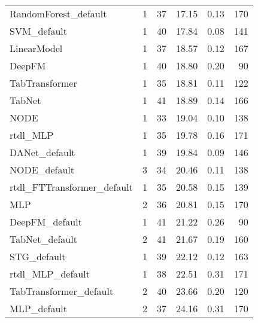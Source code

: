 \begin{tabular}{lrrrrr}
RandomForest_default       &                  1 &  37 &  17.15 &                           0.13 &   170 \\
SVM_default                &                  1 &  40 &  17.84 &                           0.08 &   141 \\
LinearModel                &                  1 &  37 &  18.57 &                           0.12 &   167 \\
DeepFM                     &                  1 &  40 &  18.80 &                           0.20 &    90 \\
TabTransformer             &                  1 &  35 &  18.81 &                           0.11 &   122 \\
TabNet                     &                  1 &  41 &  18.89 &                           0.14 &   166 \\
NODE                       &                  1 &  33 &  19.04 &                           0.10 &   138 \\
rtdl_MLP                   &                  1 &  35 &  19.78 &                           0.16 &   171 \\
DANet_default              &                  1 &  39 &  19.84 &                           0.09 &   146 \\
NODE_default               &                  3 &  34 &  20.46 &                           0.11 &   138 \\
rtdl_FTTransformer_default &                  1 &  35 &  20.58 &                           0.15 &   139 \\
MLP                        &                  2 &  36 &  20.81 &                           0.15 &   170 \\
DeepFM_default             &                  1 &  41 &  21.22 &                           0.26 &    90 \\
TabNet_default             &                  2 &  41 &  21.67 &                           0.19 &   160 \\
STG_default                &                  1 &  39 &  22.12 &                           0.12 &   163 \\
rtdl_MLP_default           &                  1 &  38 &  22.51 &                           0.31 &   171 \\
TabTransformer_default     &                  2 &  40 &  23.66 &                           0.20 &   120 \\
MLP_default                &                  2 &  37 &  24.16 &                           0.31 &   170 \\

\end{tabular}
